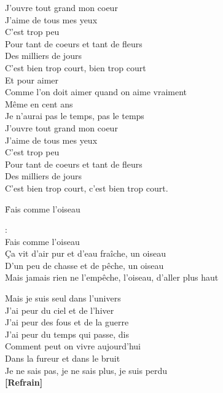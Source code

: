 \documentclass{novel}
\begin{document}
{\begin{minipage}[t][0.65\textheight][t]{\textwidth}
\begin{multicols}{2}
J'ouvre tout grand mon coeur \\
J'aime de tous mes yeux \\
C'est trop peu \\
Pour tant de coeurs et tant de fleurs \\
Des milliers de jours \\
C'est bien trop court, bien trop court \\

Et pour aimer \\
Comme l'on doit aimer quand on aime vraiment \\
Même en cent ans \\
Je n'aurai pas le temps, pas le temps \\

J'ouvre tout grand mon coeur \\
J'aime de tous mes yeux \\
C'est trop peu \\
Pour tant de coeurs et tant de fleurs \\
Des milliers de jours \\
C'est bien trop court, c'est bien trop court.

\end{multicols}
\end{minipage}
}

\newpage
\normalsize
\h*{Fais comme l’oiseau}


\begin{bfseries}
[Refrain]:\\
Fais comme l'oiseau \\
Ça vit d'air pur et d'eau fraîche, un oiseau \\
D'un peu de chasse et de pêche, un oiseau \\
Mais jamais rien ne l'empêche, l'oiseau, d'aller plus haut \\
\end{bfseries}

Mais je suis seul dans l'univers \\
J'ai peur du ciel et de l'hiver \\
J'ai peur des fous et de la guerre \\
J'ai peur du temps qui passe, dis \\
Comment peut on vivre aujourd'hui \\
Dans la fureur et dans le bruit \\
Je ne sais pas, je ne sais plus, je suis perdu \\

\textbf{[Refrain]} \\
\end{document}
